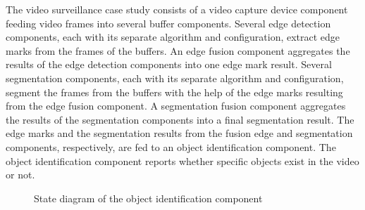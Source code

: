 


The video surveillance case study consists of a video capture device component
feeding video frames into several buffer components. 
Several edge detection components, each with its separate algorithm and configuration, 
extract edge marks from the frames of the buffers. 
An edge fusion component aggregates the results of the edge detection components 
into one edge mark result. 
Several segmentation components, each with its separate algorithm and configuration,
segment the frames from the buffers with the help of the edge marks resulting from 
the edge fusion component.
A segmentation fusion component aggregates the results of the segmentation components
into a final segmentation result. 
The edge marks and the segmentation results from the fusion edge and segmentation components, 
respectively, 
are fed to an object identification component. 
The object identification component reports whether specific objects exist in the video or not. 







\begin{figure}
\caption{State diagram of the object identification 
  component}
\end{figure}

